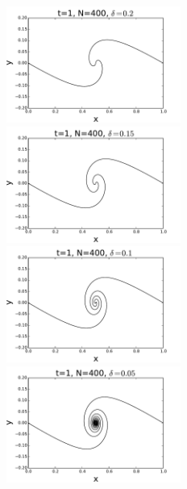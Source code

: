 \documentclass[12pt,twoside]{article}
\begin{document}
\begin{figure}[ht]
\centering
\begin{minipage}[b]{0.45\linewidth}
 \includegraphics[width=2.7in,height=1.5in]{k12.pdf}
 \includegraphics[width=2.7in,height=1.5in]{k13.pdf}
\includegraphics[width=2.7in,height=1.5in]{k14.pdf}
\includegraphics[width=2.7in,height=1.5in]{k15.pdf}
\label{fig:minipage2}
\end{minipage}
\quad
\begin{minipage}[b]{0.45\linewidth}

\end{minipage}
\end{figure}
\end{document}
